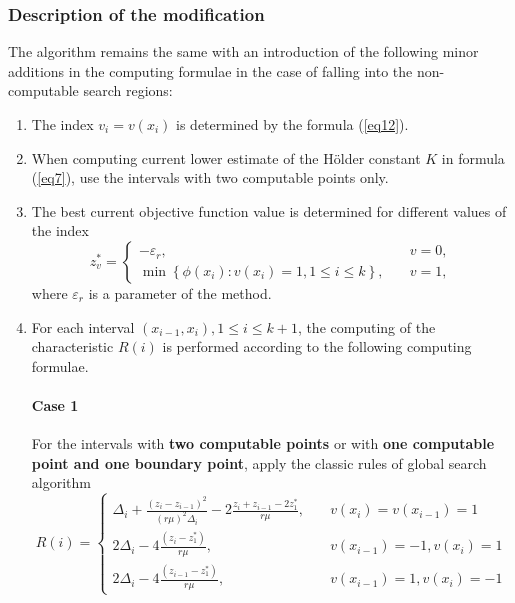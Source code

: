 \documentclass[runningheads]{llncs}
\begin{document}
\subsubsection{Description of the modification} The algorithm remains the same with an introduction of the following minor additions in the computing formulae in the case of falling into the non-computable search regions:
\begin{enumerate} 
  \item The index $v_i=v(x_i)$ is determined by the formula (\ref{eq12}).
  \item When computing current lower estimate of the H{\"o}lder constant $K$ in formula (\ref{eq7}), use the intervals with two computable points only.
  \item The best current objective function value is determined for different values of the index
\begin{equation}\label{eq20} 
z_v^*=
  \begin{cases}
    -\varepsilon _r, & {\quad v=0 ,}\\
    \min \left\{ \phi (x_i): v(x_i)=1, 1 \leq i \leq k \right\}, & {\quad v=1 ,}
  \end{cases}
\end{equation}
where $\varepsilon _r$ is a parameter of the method.

  \item For each interval $(x_{i-1}, x_i), 1 \leq i \leq k+1$, the computing of the characteristic $R(i)$ is performed according to the following computing formulae.
      
        \paragraph{Case 1} For the intervals with \textbf{two computable points} or with \textbf{one computable point and one boundary point}, apply the classic rules of global search algorithm
\begin{equation}\label{eq21} 
R(i)=
  \begin{cases}
     \Delta _i+\frac {{(z_i-z_{i-1})}^2}{{(r \mu)}^2 \Delta _i} - 2 \frac {z_i+z_{i-1}-2z_1^*}{r \mu}, & {\quad  v(x_i)=v(x_{i-1})=1}\\
    2 \Delta _i-4 \frac {(z_i-z_1^*)}{r \mu}, & {\quad  v(x_{i-1})=-1, v(x_i)=1}\\
    2 \Delta _i-4 \frac {(z_{i-1}-z_1^*)}{r \mu}, & {\quad  v(x_{i-1})=1, v(x_i)=-1}
  \end{cases}
\end{equation}

\end{enumerate}
\end{document}
